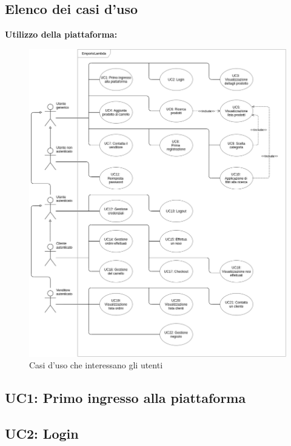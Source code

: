 \begin{itemize}
\begin{itemize}
\begin{figure}[!ht]
                            \centering
                        \end{figure}
                \end{itemize}
        \end{itemize}
    \subsection{Elenco dei casi d'uso}
        \textbf{Utilizzo della piattaforma:}
        \begin{figure}[!ht]
            \caption{Casi d'uso che interessano gli utenti}
            \vspace{10px}
            \includegraphics[scale=0.5]{../../../Images/casiUso.png}
            \centering
        \end{figure}
        \subsection{UC1: Primo ingresso alla piattaforma}
        \subsection{UC2: Login}
